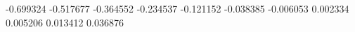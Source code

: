 -0.699324
-0.517677
-0.364552
-0.234537
-0.121152
-0.038385
-0.006053
0.002334
0.005206
0.013412
0.036876
